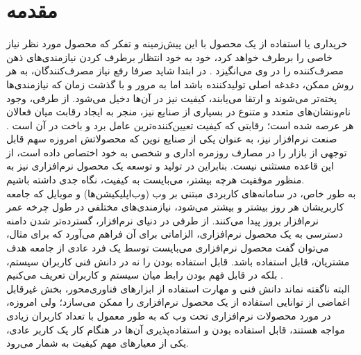 \chapter{مقدمه}
خریداری یا استفاده از یک محصول با این پیش‌زمینه و تفکر که محصول مورد نظر نیاز خاصی را برطرف خواهد کرد، خود به خود انتظار برطرف کردن نیازمندی‌های ذهن مصرف‌کننده را در وی می‌انگیزد
\cite{___1389}.
در ابتدا شاید صرفا رفع نیاز مصرف‌کنندگان، به هر روش ممکن، دغدغه اصلی تولیدکننده باشد اما به مرور و با گذشت زمان که نیازمندی‌ها پخته‌تر می‌شوند و ارتقا می‌یابند، کیفیت نیز در آن‌ها دخیل می‌شود. از طرفی، وجود نام‌ونشان‌های متعدد و متنوع در بسیاری از صنایع نیز، منجر به ایجاد رقابت میان فعالان هر عرصه شده است؛ رقابتی که کیفیت تعیین‌کننده‌ترین عامل برد و باخت در آن است
\cite{pressman_software_2015}.
صنعت نرم‌افزار نیز، به عنوان یکی از صنایع نوین که محصولاتش امروزه سهم قابل توجهی از بازار را در مصارف روزمره اداری و شخصی به خود اختصاص داده است، از این قاعده مستثنی نیست. بنابراین در تولید و توسعه یک محصول نرم‌افزاری نیز به منظور موفقیت هرچه بیشتر، می‌بایست به کیفیت، نگاه جدی داشته باشیم.\\
به طور خاص، در سامانه‌های کاربردی مبتنی بر وب (وب‌اپلیکیشن‌ها) و موبایل که جامعه کاربریشان هر روز بیشتر و بیشتر می‌شود، نیازمندی‌های مختلفی در طول چرخه عمر نرم‌افزار بروز پیدا می‌کنند. از طرفی در دنیای نرم‌افزار،  گسترده‌تر شدن دامنه دسترسی به یک محصول نرم‌افزاری، الزاماتی برای آن فراهم می‌آورد که برای مثال، می‌توان گفت محصول نرم‌افزاری می‌بایست توسط یک فرد عادی از جامعه هدف مشتریان، قابل استفاده باشد. قابل استفاده بودن را نه در دانش فنی کاربران سیستم، بلکه در قابل فهم بودن رابط میان سیستم و کاربران تعریف می‌کنیم
\cite{albert_measuring_2013}.\\
البته ناگفته نماند دانش فنی و مهارت استفاده از ابزارهای فناوری‌محور، بخش غیرقابل اغماضی از توانایی استفاده از یک محصول نرم‌افزاری را ممکن می‌سازد؛ ولی امروزه، در مورد محصولات نرم‌افزاری تحت وب که به طور معمول با تعداد کاربران زیادی مواجه هستند، قابل استفاده بودن و استفاده‌پذیری  آن‌ها در هنگام کار یک کاربر عادی، یکی از معیارهای مهم کیفیت به شمار می‌رود.
